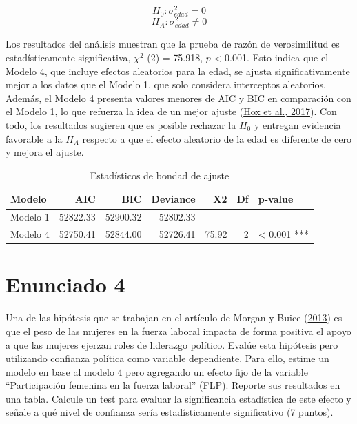 \documentclass[
  12pt,
  a4paper,
]{article}
\begin{document}
\[
H_0 : \sigma^2_{edad} = 0
\]
\[
H_A: \sigma^2_{edad} \neq 0
\]

Los resultados del análisis muestran que la prueba de razón de verosimilitud es estadísticamente significativa, \(\chi^2\) (2) = 75.918, \(p\) \textless{} 0.001. Esto indica que el Modelo 4, que incluye efectos aleatorios para la edad, se ajusta significativamente mejor a los datos que el Modelo 1, que solo considera interceptos aleatorios. Además, el Modelo 4 presenta valores menores de AIC y BIC en comparación con el Modelo 1, lo que refuerza la idea de un mejor ajuste (\protect\hyperlink{ref-hox_multilevel_2017a}{Hox et al., 2017}). Con todo, los resultados sugieren que es posible rechazar la \(H_0\) y entregan evidencia favorable a la \(H_A\) respecto a que el efecto aleatorio de la edad es diferente de cero y mejora el ajuste.

\begin{table}[!h]

\caption{\label{tab:table3}\label{tab:table3} Estadísticos de bondad de ajuste}
\centering
\begin{tabular}[t]{>{\raggedright\arraybackslash}p{2cm}rrrrrl}
\toprule
\textbf{Modelo} & \textbf{AIC} & \textbf{BIC} & \textbf{Deviance} & \textbf{X2} & \textbf{Df} & \textbf{p-value}\\
\midrule
Modelo 1 & 52822.33 & 52900.32 & 52802.33 &  &  & \\
Modelo 4 & 52750.41 & 52844.00 & 52726.41 & 75.92 & 2 & < 0.001 ***\\
\bottomrule
\end{tabular}
\end{table}

\hypertarget{enunciado-4}{%
\section{Enunciado 4}\label{enunciado-4}}

Una de las hipótesis que se trabajan en el artículo de Morgan y Buice (\protect\hyperlink{ref-morgan_latin_2013}{2013}) es que el peso de las mujeres en la fuerza laboral impacta de forma positiva el apoyo a que las mujeres ejerzan roles de liderazgo político. Evalúe esta hipótesis pero utilizando confianza política como variable dependiente. Para ello, estime un modelo en base al modelo 4 pero agregando un efecto fijo de la variable ``Participación femenina en la fuerza laboral'' (FLP). Reporte sus resultados en una tabla. Calcule un test para evaluar la significancia estadística de este efecto y señale a qué nivel de confianza sería estadísticamente significativo (7 puntos).
\end{document}
